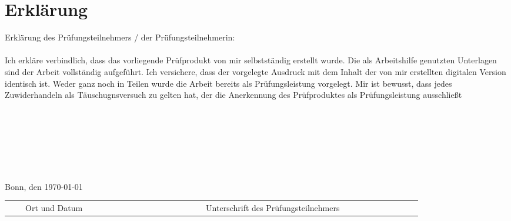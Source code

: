 \chapter{Erklärung}
Erklärung des Prüfungsteilnehmers / der Prüfungsteilnehmerin:
\\
\\
Ich erkläre verbindlich, dass das vorliegende Prüfprodukt von mir selbstständig erstellt wurde. Die als Arbeitshilfe genutzten Unterlagen sind der Arbeit vollständig aufgeführt.
Ich versichere, dass der vorgelegte Ausdruck mit dem Inhalt der von mir erstellten digitalen Version identisch ist. Weder ganz noch in Teilen wurde die Arbeit bereits als Prüfungsleistung vorgelegt.
Mir ist bewusst, dass jedes Zuwiderhandeln als Täuschugnsversuch zu gelten hat, der die Anerkennung des Prüfproduktes als Prüfungsleistung ausschließt \\
\\
\\
\\
\\
\\
\\
\\\small{Bonn, den \today}\\
\begin{tabular}{r r r r r r r r r r r r r r r r r r r r r r r r r r r}
\cline{1-5} \cline{12-25}\\[-0.3cm]
& &\tiny{Ort und Datum}& & & & & & & & & & & & & & &\tiny{Unterschrift des Prüfungsteilnehmers}& & & & & & &\\
\end{tabular}
\cleardoublepage